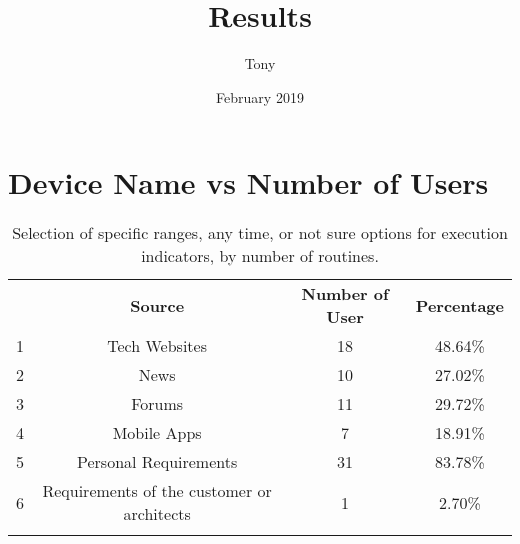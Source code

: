\documentclass{article}
\title{Results}
\author{Tony}
\date{February 2019}
\begin{document}
\maketitle

\SecurityDeviceStat

\makeatletter
{}
\makeatother

\section{Device Name vs Number of Users }

\begin{table}[t]
\centering
\scriptsize
\caption{{\small Selection of specific ranges, any time, or not sure options for
execution indicators, by number of routines.}}
\label{tbl:indicators}
\begin{tabular}{r|c|c|c}
 \Xhline{2\arrayrulewidth}
{\bf }    & {\bf Source}    & {\bf Number of User} & {\bf Percentage}\\
 \Xhline{2\arrayrulewidth}
 1 & Tech Websites & 18 & 48.64\% \\
 2 & News & 10 & 27.02\% \\
 3 & Forums & 11 & 29.72\% \\
 4 & Mobile Apps & 7 & 18.91\% \\
 5 & Personal Requirements & 31 & 83.78\% \\
 6 & Requirements of the customer or architects & 1 &2.70\% \\
 \Xhline{2\arrayrulewidth}
 \end{tabular}
\end{table}
\end{document}

